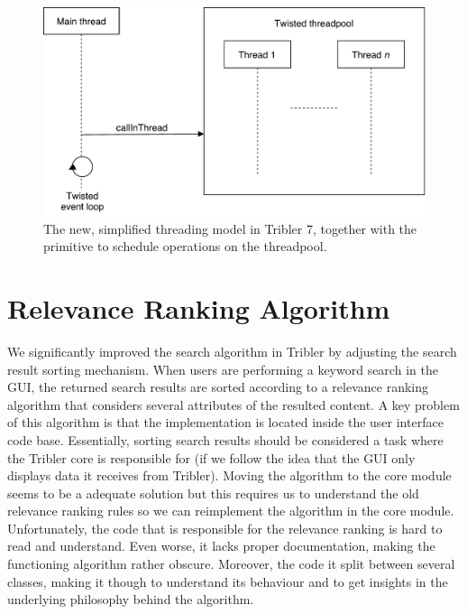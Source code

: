 \begin{figure}[h!]
	\centering
	\includegraphics[width=0.7\columnwidth]{images/improving_qa/new_threading_model_tribler}
	\caption{The new, simplified threading model in Tribler 7, together with the primitive to schedule operations on the threadpool.}
	\label{fig:new-threading-model}
\end{figure}

\section{Relevance Ranking Algorithm}
\label{sec:relevance-ranking-algorithm}
We significantly improved the search algorithm in Tribler by adjusting the search result sorting mechanism. When users are performing a keyword search in the GUI, the returned search results are sorted according to a relevance ranking algorithm that considers several attributes of the resulted content. A key problem of this algorithm is that the implementation is located inside the user interface code base. Essentially, sorting search results should be considered a task where the Tribler core is responsible for (if we follow the idea that the GUI only displays data it receives from Tribler). Moving the algorithm to the core module seems to be a adequate solution but this requires us to understand the old relevance ranking rules so we can reimplement the algorithm in the core module. Unfortunately, the code that is responsible for the relevance ranking is hard to read and understand. Even worse, it lacks proper documentation, making the functioning algorithm rather obscure. Moreover, the code it split between several classes, making it though to understand its behaviour and to get insights in the underlying philosophy behind the algorithm.

